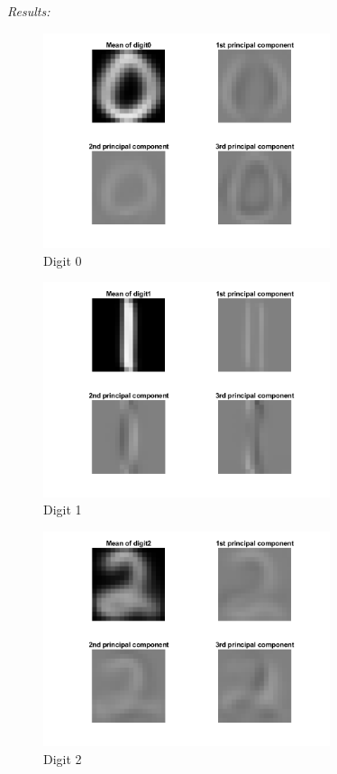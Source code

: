 \documentclass[12pt]{article}
\begin{document}
\textit{Results:}
\begin{figure}[H]
\begin{center}
    \caption{Digit 0}
    \includegraphics[width=0.75\textwidth]{images/digit0.png}
\end{center}
\end{figure}

\begin{figure}[H]
\begin{center}
    \caption{Digit 1}
    \includegraphics[width=0.75\textwidth]{images/digit1.png}
\end{center}
\end{figure}

\begin{figure}[H]
\begin{center}
    \caption{Digit 2}
    \includegraphics[width=0.75\textwidth]{images/digit2.png}
\end{center}
\end{figure}
\end{document}
